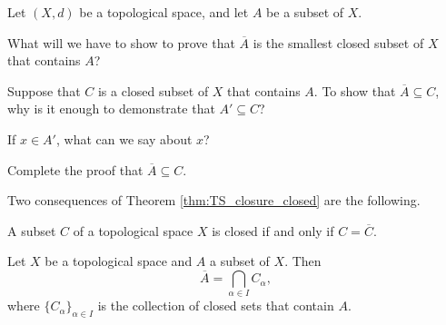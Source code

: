\begin{activity} Let $(X,d)$ be a topological space, and let $A$ be a subset of $X$. 
\ba
\item What will we have to show to prove that $\overline{A}$ is the smallest closed subset of $X$ that contains $A$?



\item Suppose that $C$ is a closed subset of $X$ that contains $A$. To show that $\overline{A} \subseteq C$, why is it enough to demonstrate that $A' \subseteq C$? 



\item If $x \in A'$, what can we say about $x$? 



\item Complete the proof that $\overline{A} \subseteq C$.



\begin{comment}

We need to prove that any closed subset of $X$ that contains $A$ also contains $\overline{A}$. Suppose that $C$ is a closed subset of $X$ that contains $A$. To show that $C$ contains $\overline{A}$, we need only to show that $C$ contains $A'$. Let $x \in A'$, and let $N$ be a neighborhood of $x$. Then $N$ contains a point of $A$ different than $x$. Since $A \subseteq C$, it follows that $N$ contains a point of $C$ different than $x$. So $x$ is a limit point of $C$. The fact that $C$ is closed means that $C$ contains its limit points, so $x \in C$. Therefore, $A' \subseteq C$ and $\overline{A} \subseteq C$. 
\end{comment}

\ea

\end{activity}



Two consequences of Theorem \ref{thm:TS_closure_closed} are the following.



\begin{corollary} A subset $C$ of a topological space $X$ is closed if and only if $C = \overline{C}$. 
\end{corollary}



\begin{corollary} Let $X$ be a topological space and $A$ a subset of $X$. Then 
\[\overline{A} = \bigcap_{\alpha \in I} C_{\alpha},\]
where $\{C_{\alpha}\}_{\alpha \in I}$ is the collection of closed sets that contain $A$. 
\end{corollary}

